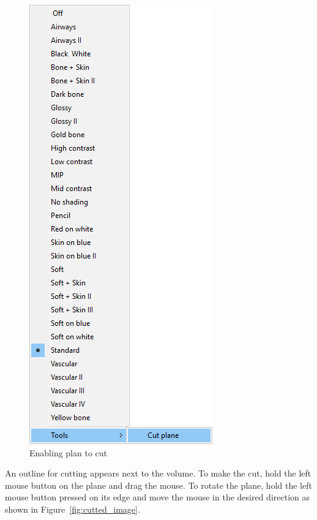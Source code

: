 \begin{figure}[!htb]
\centering
\includegraphics[scale=0.4]{../user_guide_figures/invesalius_screen/activate_cut_plane_en.png}
\caption{Enabling plan to cut}
\label{fig:activate_cut_plane}
\end{figure}

An outline for cutting appears next to the volume. To make the cut, hold the left mouse button on the plane and drag the mouse. To rotate the plane, hold the left mouse button pressed on its edge and move the mouse in the desired direction as shown in Figure~\ref{fig:cutted_image}.

